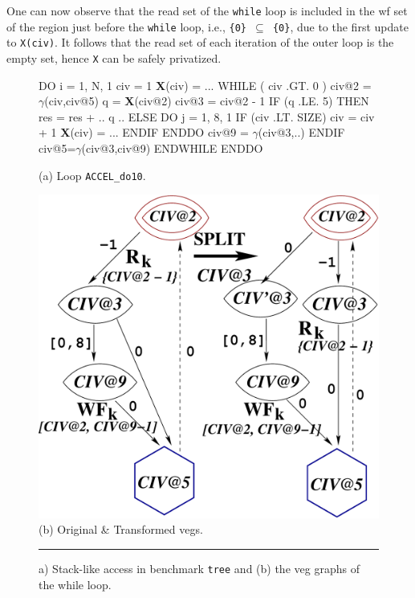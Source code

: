 \documentclass{sig-alternate}
\newcommand{\mymath}[1]{$ #1 $}
\begin{document}
One can now observe that the read set of the {\tt while} loop 
is included in the {\sc wf} set of the region just before the 
{\tt while} loop, i.e., {\tt \{0\} $\subseteq$ \{0\}}, due to the 
first update to {\tt X(civ)}. It follows that the read set of
each iteration of the outer loop is the empty set, 
hence {\tt X} can be safely privatized. 


\begin{figure}
\begin{minipage}{0.4\columnwidth}
\begin{colorcode}
DO i = 1, N, 1
 civ = 1
 {\bf{}X}(civ) = ...
 WHILE ( civ .GT. 0 )
  civ@2 = \mymath{\gamma}(civ,civ@5)
  q = {\bf X}(civ@2)
  civ@3 = civ@2 - 1
  IF (q .LE. 5) THEN
   res = res + .. q ..
  ELSE
   DO j = 1, 8, 1
    IF (civ .LT. SIZE) 
      civ = civ + 1
      {\bf{}X}(civ) = ...
   ENDIF ENDDO
   civ@9 = \mymath{\gamma}(civ@3,..)
  ENDIF
  civ@5=\mymath{\gamma}(civ@3,civ@9)
ENDWHILE ENDDO   
\end{colorcode}
\vspace{-1ex}
(a) Loop {\tt ACCEL\_do10}.
\end{minipage}
\begin{minipage}{0.56\columnwidth}
\includegraphics[width=1.1\textwidth]{Figures/VEG_TREE}\\
(b) Original \& Transformed {\sc veg}s.
\end{minipage}
\hrule
\caption{a) Stack-like access in benchmark {\tt tree} and (b) the {\sc veg} graphs of the while loop.}
\vspace{-1ex}
\label{fig:Tree} %
\end{figure}
\end{document}
